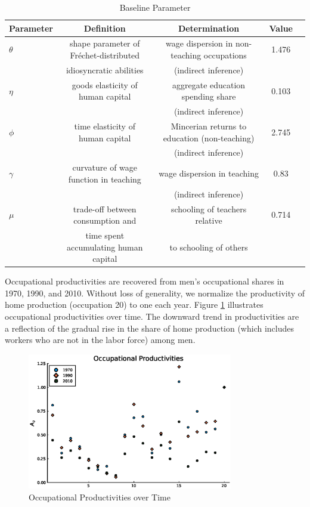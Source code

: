 \documentclass[onehalfspacing,11pt]{article}
\begin{document}
\begin{landscape}	
		\begin{table}[h!]
		\centering
		\small
		\begin{tabular}{lcccc}
			\toprule
			Parameter & Definition & Determination & Value\\
			\midrule
			$\theta$ & shape parameter of Fr\'echet-distributed & wage dispersion in non-teaching occupations & 1.476\\
			& idiosyncratic abilities & (indirect inference) &\\
			$\eta$ & goods elasticity of human capital & aggregate education spending share  & 0.103\\
			& & (indirect inference) &\\
			$\phi$ & time elasticity of human capital & Mincerian returns to education (non-teaching) & 2.745\\
			& & (indirect inference) &\\
			$\gamma$ & curvature of wage function in teaching & wage dispersion in teaching & 0.83\\
			&& (indirect inference) &\\
			$\mu$ &  trade-off between consumption and & schooling of teachers relative & 0.714\\
			& time spent accumulating human capital & to schooling of others & \\
			\bottomrule
		\end{tabular}
		\caption{Baseline Parameter}
		\label{tab:param}
	\end{table}
\end{landscape}

Occupational productivities are recovered from men's occupational shares in 1970, 1990, and 2010. Without loss of generality, we normalize the productivity of home production (occupation 20) to one each year. Figure \ref{fig:prod} illustrates occupational productivities over time. The downward trend in productivities are a reflection of the gradual rise in the share of home production (which includes workers who are not in the labor force) among men.

	\begin{figure}
		\begin{center}
			\includegraphics[width=0.8\textwidth]{A_men_70_10.eps}
			\caption{Occupational Productivities over Time}
			\label{fig:prod}
		\end{center}
	\end{figure}
	
\end{document}
